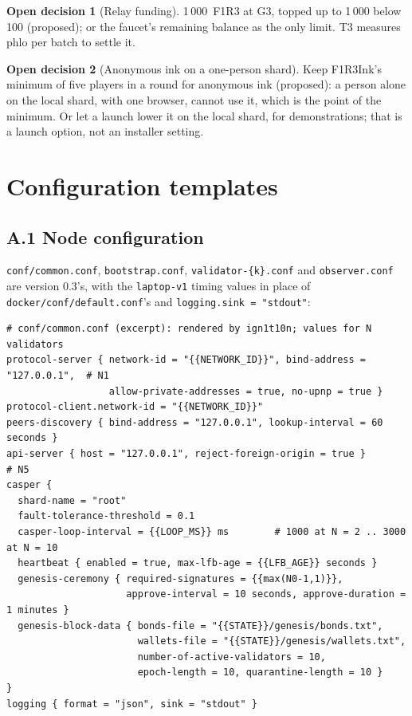 \documentclass[11pt]{article}
\theoremstyle{definition}
\newtheorem{decision}{Open decision}
\theoremstyle{remark}
\newcommand{\code}[1]{\texttt{#1}}
\begin{document}
\begin{decision}[Relay funding]\label{dec:relayfund}
1\,000~F1R3 at G3, topped up to 1\,000 below 100 (proposed); or the faucet's
remaining balance as the only limit. T3 measures phlo per batch to settle it.
\end{decision}

\begin{decision}[Anonymous ink on a one-person shard]\label{dec:anonmin}
Keep F1R3Ink's minimum of five players in a round for anonymous ink (proposed): a
person alone on the local shard, with one browser, cannot use it, which is the point
of the minimum. Or let a launch lower it on the local shard, for demonstrations; that
is a launch option, not an installer setting.
\end{decision}

\appendix
\section{Configuration templates}\label{app:conf}

\subsection*{A.1 Node configuration}

\code{conf/common.conf}, \code{bootstrap.conf}, \code{validator-\{k\}.conf} and
\code{observer.conf} are version 0.3's, with the \code{laptop-v1} timing values in
place of \code{docker/conf/default.conf}'s and \code{logging.sink = "stdout"}:

\begin{lstlisting}[language=Hocon]
# conf/common.conf (excerpt): rendered by ign1t10n; values for N validators
protocol-server { network-id = "{{NETWORK_ID}}", bind-address = "127.0.0.1",  # N1
                  allow-private-addresses = true, no-upnp = true }
protocol-client.network-id = "{{NETWORK_ID}}"
peers-discovery { bind-address = "127.0.0.1", lookup-interval = 60 seconds }
api-server { host = "127.0.0.1", reject-foreign-origin = true }                # N5
casper {
  shard-name = "root"
  fault-tolerance-threshold = 0.1
  casper-loop-interval = {{LOOP_MS}} ms        # 1000 at N = 2 .. 3000 at N = 10
  heartbeat { enabled = true, max-lfb-age = {{LFB_AGE}} seconds }
  genesis-ceremony { required-signatures = {{max(N0-1,1)}},
                     approve-interval = 10 seconds, approve-duration = 1 minutes }
  genesis-block-data { bonds-file = "{{STATE}}/genesis/bonds.txt",
                       wallets-file = "{{STATE}}/genesis/wallets.txt",
                       number-of-active-validators = 10,
                       epoch-length = 10, quarantine-length = 10 }
}
logging { format = "json", sink = "stdout" }
\end{lstlisting}
\end{document}
